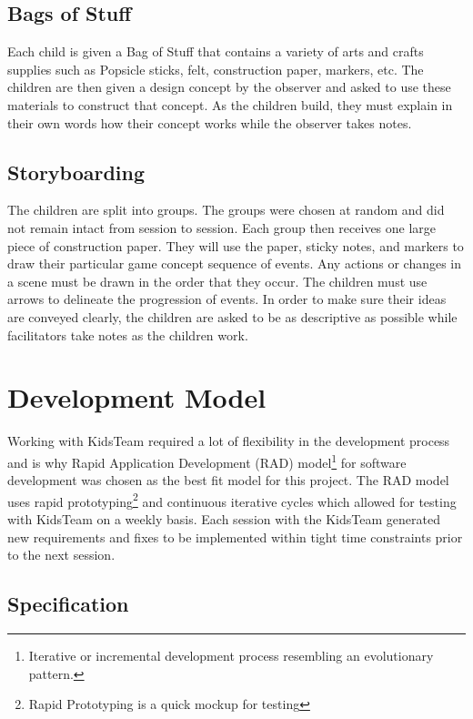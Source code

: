 \subsection{Bags of Stuff} \label{sec:bagsofstuff}
Each child is given a Bag of Stuff that contains a variety of arts and crafts supplies such as Popsicle sticks, felt, construction paper, markers, etc. The children are then given a design concept by the observer and asked to use these materials to construct that concept. As the children build, they must explain in their own words how their concept works while the observer takes notes. \cite{Druin:1999:CID:302979.303166}\cite{Druin02therole}

\subsection{Storyboarding}\label{sec:storyboarding}

The children are split into groups. The groups were chosen at random and did not remain intact from session to session. Each group then receives one large piece of construction paper. They will use the paper, sticky notes, and markers to draw their particular game concept sequence of events. Any actions or changes in a scene must be drawn in the order that they occur. The children must use arrows to delineate the progression of events. In order to make sure their ideas are conveyed clearly, the children are asked to be as descriptive as possible while facilitators take notes as the children work. \cite{Druin:1999:CID:302979.303166}\cite{Druin02therole}

\section{Development Model}
Working with KidsTeam required a lot of flexibility in the development process and is why Rapid Application Development (RAD) model\footnote{Iterative or incremental development process resembling an evolutionary pattern.} for software development was chosen as the best fit model for this project. The RAD model uses rapid prototyping\footnote{Rapid Prototyping is a quick mockup for testing} and continuous iterative cycles which allowed for testing with KidsTeam on a weekly basis. Each session with the KidsTeam generated new requirements and fixes to be implemented within tight time constraints prior to the next session.

\subsection{Specification}

